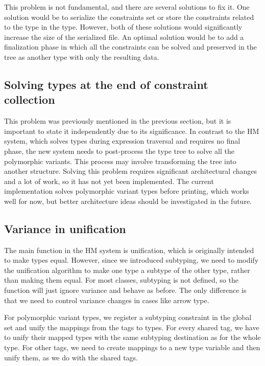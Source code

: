\documentclass[a4paper,11pt,oneside]{article}
\theoremstyle{definition}
\begin{document}
This problem is not fundamental, and there are several solutions to fix it.
One solution would be to serialize the constraints set or store the constraints
related to the type in the type. However, both of these solutions would
significantly increase the size of the serialized file. An optimal solution
would be to add a finalization phase in which all the constraints can be
solved and preserved in the tree as another type with only the resulting data.

\subsection{Solving types at the end of constraint collection}

This problem was previously mentioned in the previous section, but it is
important to state it independently due to its significance. In contrast
to the HM system, which solves types during expression traversal and
requires no final phase, the new system needs to post-process the type
tree to solve all the polymorphic variants. This process may involve
transforming the tree into another structure. Solving this problem requires
significant architectural changes and a lot of work, so it has not yet been
implemented. The current implementation solves polymorphic variant types
before printing, which works well for now, but better architecture ideas
should be investigated in the future.

\subsection{Variance in unification}

The main function in the HM system is unification, which is originally
intended to make types equal. However, since we introduced subtyping, we
need to modify the unification algorithm to make one type a subtype of the
other type, rather than making them equal. For most classes, subtyping is
not defined, so the function will just ignore variance and behave as before.
The only difference is that we need to control variance changes in cases
like arrow type.

For polymorphic variant types, we register a subtyping constraint in the
global set and unify the mappings from the tags to types. For every shared
tag, we have to unify their mapped types with the same subtyping destination
as for the whole type. For other tags, we need to create mappings to a new
type variable and then unify them, as we do with the shared tags.
\end{document}
